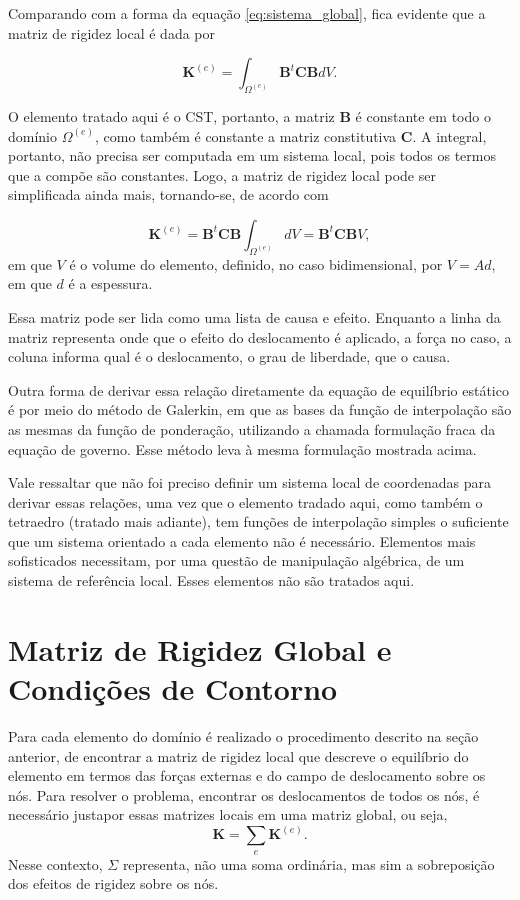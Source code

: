 Comparando com a forma da equação \ref{eq:sistema_global}, fica evidente que a matriz de rigidez local é dada por

\begin{equation}
    \bm{K}^{(e)} = \int_{\Omega^{(e)}} \bm{B}^t \bm{C} \bm{B} dV.
\end{equation}

O elemento tratado aqui é o CST, portanto, a matriz $\bm{B}$ é constante em todo o domínio $\Omega^{(e)}$, como também é constante a matriz constitutiva $\bm{C}$. A integral, portanto, não precisa ser computada em um sistema local, pois todos os termos que a compõe são constantes. Logo, a matriz de rigidez local pode ser simplificada ainda mais, tornando-se, de acordo com 

\begin{equation}
    \bm{K}^{(e)} = \bm{B}^t \bm{C} \bm{B} \int_{\Omega^{(e)}} dV = \bm{B}^t \bm{C} \bm{B} V,
\end{equation}
em que $V$ é o volume do elemento, definido, no caso bidimensional, por $V = A d$, em que $d$ é a espessura.

Essa matriz pode ser lida como uma lista de causa e efeito. Enquanto a linha da matriz representa onde que o efeito do deslocamento é aplicado, a força no caso, a coluna informa qual é o deslocamento, o grau de liberdade, que o causa. \cite{LOGAN}

Outra forma de derivar essa relação diretamente da equação de equilíbrio estático é por meio do método de Galerkin, em que as bases da função de interpolação são as mesmas da função de ponderação, utilizando a chamada formulação fraca da equação de governo. Esse método leva à mesma formulação mostrada acima.

Vale ressaltar que não foi preciso definir um sistema local de coordenadas para derivar essas relações, uma vez que o elemento tradado aqui, como também o tetraedro (tratado mais adiante), tem funções de interpolação simples o suficiente que um sistema orientado a cada elemento não é necessário. Elementos mais sofisticados necessitam, por uma questão de manipulação algébrica, de um sistema de referência local. Esses elementos não são tratados aqui.

\section{Matriz de Rigidez Global e Condições de Contorno}

Para cada elemento do domínio é realizado o procedimento descrito na seção anterior, de encontrar a matriz de rigidez local que descreve o equilíbrio do elemento em termos das forças externas e do campo de deslocamento sobre os nós. Para resolver o problema, encontrar os deslocamentos de todos os nós, é necessário justapor essas matrizes locais em uma matriz global, ou seja,
\begin{equation}
    \bm{K} = \sum_{e} \bm{K}^{(e)}.
\end{equation}
Nesse contexto, $\Sigma$ representa, não uma soma ordinária, mas sim a sobreposição dos efeitos de rigidez sobre os nós. \cite{LOGAN}

